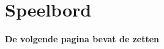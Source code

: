 \section*{Speelbord}

\begin{center}
\end{center}

\vspace{+0.4cm}

\centerline{\Large{\textbf{De volgende pagina bevat de zetten}}}